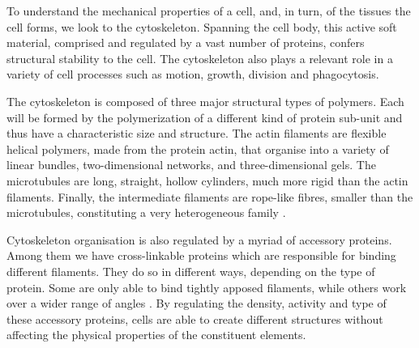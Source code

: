 \documentclass[../../main.tex]{subfiles}
\begin{document}
%
    To understand the mechanical properties of a cell, and, in turn, of the tissues the cell forms, we look to the cytoskeleton. Spanning the cell body, this active soft material, comprised and regulated by a vast number of proteins, confers structural stability to the cell. The cytoskeleton also plays a relevant role in a variety of cell processes such as motion, growth, division and phagocytosis.

    The cytoskeleton is composed of three major structural types of polymers. Each will be formed by the polymerization of a different kind of protein sub-unit and thus have a characteristic size and structure. The actin filaments are flexible helical polymers, made from the protein actin, that organise into a variety of linear bundles, two-dimensional networks, and three-dimensional gels. The microtubules are long, straight, hollow cylinders, much more rigid than the actin filaments. Finally, the intermediate filaments are rope-like fibres, smaller than the microtubules, constituting a very heterogeneous family \cite{albertsMolecularBiologyCell2015, hardinBeckerWorldCell2016}.
    
    Cytoskeleton organisation is also regulated by a myriad of accessory proteins. Among them we have cross-linkable proteins which are responsible for binding different filaments. They do so in different ways, depending on the type of protein. Some are only able to bind tightly apposed filaments, while others work over a wider range of angles \cite{coursonActinCrosslinkAssembly2010}. By regulating the density, activity and type of these accessory proteins, cells are able to create different structures without affecting the physical properties of the constituent elements. 
    
\end{document}
